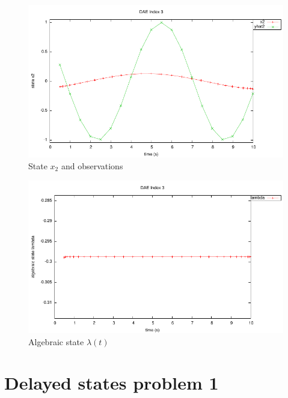 \documentclass[a4paper,11pt]{report}    %
\begin{document}
\begin{figure}
  \centering
  \includegraphics{../examples/dae_i3/x2}
  \caption{State $x_2$ and observations}
 \label{fig:dae_i3_x2}
\end{figure}

\begin{figure}
  \centering
  \includegraphics{../examples/dae_i3/lambda}
  \caption{Algebraic state $\lambda(t)$}
 \label{fig:dae_i3_lambda}
\end{figure}

\section{Delayed states problem 1}
\end{document}
